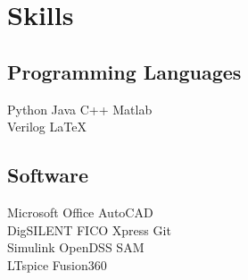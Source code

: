 \section{Skills \faCode}
\subsection{Programming Languages}
Python \textbullet{} Java \textbullet{} C++ \textbullet{}
Matlab \\ Verilog \textbullet{} \LaTeX
\sectionsep
\subsection{Software}
Microsoft Office \textbullet{} AutoCAD \\ 
DigSILENT \textbullet{} FICO Xpress \textbullet{} Git \\ 
Simulink \textbullet{} OpenDSS \textbullet{} SAM  \\
LTspice \textbullet{} Fusion360
\sectionsep